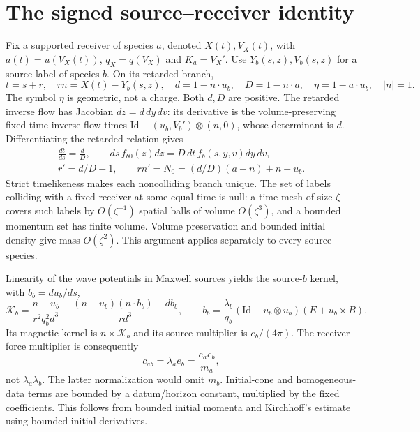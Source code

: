 \documentclass[11pt]{article}
\newcommand{\Id}{\mathrm{Id}}
\theoremstyle{remark}\newtheorem{remark}[theorem]{Remark}
\numberwithin{equation}{section}
\begin{document}
\section{The signed source--receiver identity}
Fix a supported receiver of species $a$, denoted $X(t),V_X(t)$, with
$a(t)=u(V_X(t))$, $q_X=q(V_X)$ and $K_a=V_X'$. Use $Y_b(s,z),V_b(s,z)$
for a source label of species $b$. On its retarded branch,
\begin{equation}\label{eq:geometry}
 t=s+r,\quad rn=X(t)-Y_b(s,z),\quad
 d=1-n\cdot u_b,\quad D=1-n\cdot a,\quad \eta=1-a\cdot u_b,
 \quad |n|=1.
\end{equation}
The symbol $\eta$ is geometric, not a charge. Both $d,D$ are positive.
The retarded inverse flow has Jacobian $dz=d\,dy\,dv$: its derivative is
the volume-preserving fixed-time inverse flow times
$\Id-(u_b,V_b')\otimes(n,0)$, whose determinant is $d$.
Differentiating the retarded relation gives
\begin{equation}\label{eq:measure}
 \begin{gathered}
 \frac{dt}{ds}=\frac dD,\qquad
 ds\,f_{b0}(z)dz=D\,dt\,f_b(s,y,v)dy\,dv,\\
 r'=d/D-1,\qquad rn'=N_0=(d/D)(a-n)+n-u_b.
 \end{gathered}
\end{equation}
Strict timelikeness makes each noncolliding branch unique. The set of labels
colliding with a fixed receiver at some equal time is null: a time mesh
of size $\zeta$ covers such labels by $O(\zeta^{-1})$ spatial balls of
volume $O(\zeta^3)$, and a bounded momentum set has finite volume.
Volume preservation and bounded initial density give mass $O(\zeta^2)$.
This argument applies separately to every source species.

Linearity of the wave potentials in Maxwell sources yields the source-$b$
kernel, with $b_b=du_b/ds$,
\begin{equation}\label{eq:kernel}
 \mathscr K_b=\frac{n-u_b}{r^2q_b^2d^3}
       +\frac{(n-u_b)(n\cdot b_b)-db_b}{rd^3},\qquad
 b_b=\frac{\lambda_b}{q_b}(\Id-u_b\otimes u_b)(E+u_b\times B).
\end{equation}
Its magnetic kernel is $n\times\mathscr K_b$ and its source multiplier
is $e_b/(4\pi)$. The receiver force multiplier is consequently
\begin{equation}\label{eq:pair-factor}
 c_{ab}=\lambda_a e_b=\frac{e_ae_b}{m_a},
\end{equation}
not $\lambda_a\lambda_b$. The latter normalization would omit $m_b$.
Initial-cone and homogeneous-data terms are bounded by a datum/horizon
constant, multiplied by the fixed coefficients. This follows from bounded
initial momenta and Kirchhoff's estimate using bounded initial derivatives.
\end{document}
